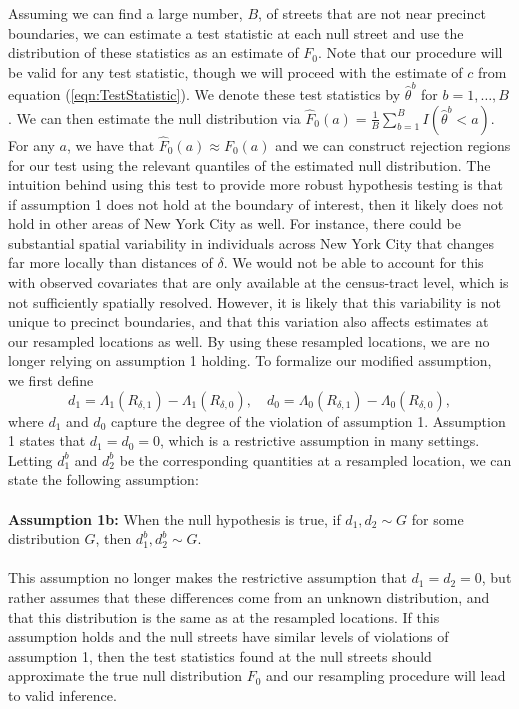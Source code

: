 \documentclass[a4paper,11pt]{article}
\begin{document}
Assuming we can find a large number, $B$, of streets that are not near precinct boundaries, we can estimate a test statistic at each null street and use the distribution of these statistics as an estimate of $F_0$. Note that our procedure will be valid for any test statistic, though we will proceed with the estimate of $c$ from equation (\ref{eqn:TestStatistic}).  We denote these test statistics by $\widehat{\theta}^b$ for $b=1, \dots, B$.  We can then estimate the null distribution via $\widehat{F}_0(a) = \frac{1}{B} \sum_{b=1}^B I(\widehat{\theta}^b < a)$. For any $a$, we have that $\widehat{F}_0(a) \approx F_0(a)$ and we can construct rejection regions for our test using the relevant quantiles of the estimated null distribution. The intuition behind using this test to provide more robust hypothesis testing is that if assumption 1 does not hold at the boundary of interest, then it likely does not hold in other areas of New York City as well. For instance, there could be substantial spatial variability in individuals across New York City that changes far more locally than distances of $\delta$. We would not be able to account for this with observed covariates that are only available at the census-tract level, which is not sufficiently spatially resolved. However, it is likely that this variability is not unique to precinct boundaries, and that this variation also affects estimates at our resampled locations as well. By using these resampled locations, we are no longer relying on assumption 1 holding. To formalize our modified assumption, we first define $$d_1 = \Lambda_1(R_{\delta, 1}) - \Lambda_1(R_{\delta, 0}), \quad d_0 = \Lambda_0(R_{\delta, 1}) - \Lambda_0(R_{\delta, 0}),$$ 
where $d_1$ and $d_0$ capture the degree of the violation of assumption 1. Assumption 1 states that $d_1 = d_0 = 0$, which is a restrictive assumption in many settings. Letting $d_1^b$ and $d_2^b$ be the corresponding quantities at a resampled location, we can state the following assumption: \\
\\
\textbf{Assumption 1b:} When the null hypothesis is true, if $d_1,d_2 \sim G$ for some distribution $G$, then $d_1^b, d_2^b \sim G$. \\
\\
This assumption no longer makes the restrictive assumption that $d_1 = d_2 =0$, but rather assumes that these differences come from an unknown distribution, and that this distribution is the same as at the resampled locations. If this assumption holds and the null streets have similar levels of violations of assumption 1, then the test statistics found at the null streets should approximate the true null distribution $F_0$ and our resampling procedure will lead to valid inference. 
\end{document}

